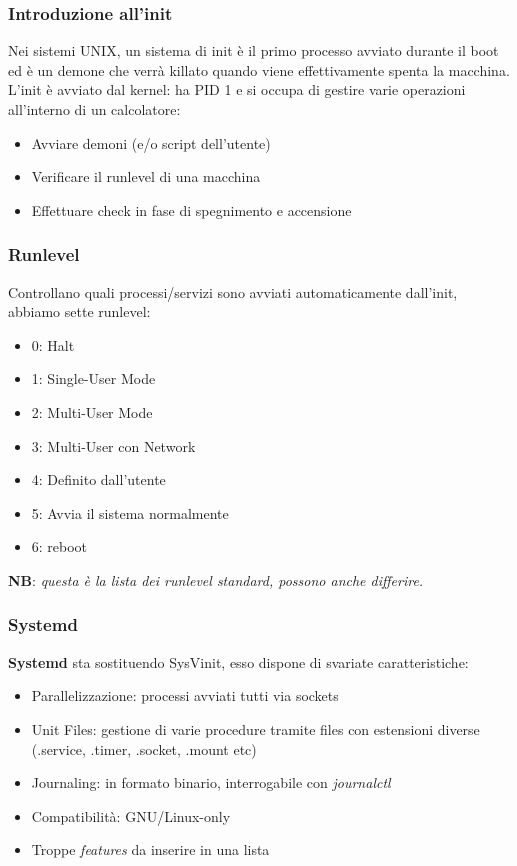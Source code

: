 \documentclass{beamer}
\begin{document}
\begin{frame}
\frametitle{Introduzione all'init}
Nei sistemi UNIX, un sistema di init \`e il primo processo avviato durante il boot ed \`e un demone che verr\`a killato quando viene effettivamente spenta la macchina. L'init \`e avviato dal kernel: ha PID 1 e si occupa di gestire varie operazioni all'interno di un calcolatore:
\begin{itemize}
	\item Avviare demoni (e/o script dell'utente)
	\item Verificare il runlevel di una macchina
	\item Effettuare check in fase di spegnimento e accensione
\end{itemize}
\end{frame}


\begin{frame}
\frametitle{Runlevel}
Controllano quali processi/servizi sono avviati automaticamente dall'init, abbiamo sette runlevel:
\begin{itemize}
	\item 0: Halt
	\item 1: Single-User Mode
	\item 2: Multi-User Mode
	\item 3: Multi-User con Network
	\item 4: Definito dall'utente
	\item 5: Avvia il sistema normalmente
	\item 6: reboot
\end{itemize}

\textbf{NB}: \textit{questa \`e la lista dei runlevel standard, possono anche differire.}
\end{frame}


\begin{frame}
\frametitle{Systemd}
\textbf{Systemd} sta sostituendo SysVinit, esso dispone di svariate caratteristiche:
\begin{itemize}
	\item Parallelizzazione: processi avviati tutti via sockets
	\item Unit Files: gestione di varie procedure tramite files con estensioni diverse (.service, .timer, .socket, .mount etc)
	\item Journaling: in formato binario, interrogabile con \textit{journalctl}
	\item Compatibilit\`a: GNU/Linux-only
	\item Troppe \textit{features} da inserire in una lista
\end{itemize}
\end{frame}
\end{document}
